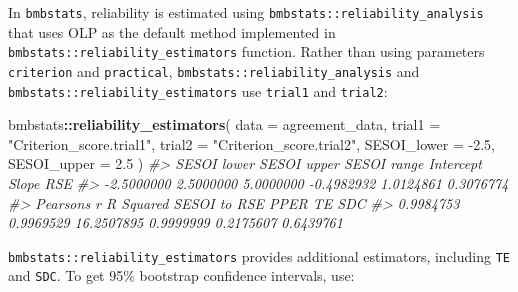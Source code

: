 \documentclass[
]{book}
\newenvironment{Shaded}{\begin{snugshade}}{\end{snugshade}}
\newcommand{\CommentTok}[1]{\textcolor[rgb]{0.56,0.35,0.01}{\textit{#1}}}
\newcommand{\DataTypeTok}[1]{\textcolor[rgb]{0.13,0.29,0.53}{#1}}
\newcommand{\FloatTok}[1]{\textcolor[rgb]{0.00,0.00,0.81}{#1}}
\newcommand{\KeywordTok}[1]{\textcolor[rgb]{0.13,0.29,0.53}{\textbf{#1}}}
\newcommand{\NormalTok}[1]{#1}
\newcommand{\OperatorTok}[1]{\textcolor[rgb]{0.81,0.36,0.00}{\textbf{#1}}}
\newcommand{\StringTok}[1]{\textcolor[rgb]{0.31,0.60,0.02}{#1}}
\begin{document}
In \texttt{bmbstats}, reliability is estimated using \texttt{bmbstats::reliability\_analysis} that uses OLP as the default method implemented in \texttt{bmbstats::reliability\_estimators} function. Rather than using parameters \texttt{criterion} and \texttt{practical}, \texttt{bmbstats::reliability\_analysis} and \texttt{bmbstats::reliability\_estimators} use \texttt{trial1} and \texttt{trial2}:

\begin{Shaded}
\begin{Highlighting}[]
\NormalTok{bmbstats}\OperatorTok{::}\KeywordTok{reliability\_estimators}\NormalTok{(}
  \DataTypeTok{data =}\NormalTok{ agreement\_data,}
  \DataTypeTok{trial1 =} \StringTok{"Criterion\_score.trial1"}\NormalTok{,}
  \DataTypeTok{trial2 =} \StringTok{"Criterion\_score.trial2"}\NormalTok{,}
  \DataTypeTok{SESOI\_lower =} \FloatTok{{-}2.5}\NormalTok{,}
  \DataTypeTok{SESOI\_upper =} \FloatTok{2.5}
\NormalTok{)}
\CommentTok{\#>  SESOI lower  SESOI upper  SESOI range    Intercept        Slope          RSE }
\CommentTok{\#>   {-}2.5000000    2.5000000    5.0000000   {-}0.4982932    1.0124861    0.3076774 }
\CommentTok{\#>  Pearson\textquotesingle{}s r    R Squared SESOI to RSE         PPER           TE          SDC }
\CommentTok{\#>    0.9984753    0.9969529   16.2507895    0.9999999    0.2175607    0.6439761}
\end{Highlighting}
\end{Shaded}

\texttt{bmbstats::reliability\_estimators} provides additional estimators, including \texttt{TE} and \texttt{SDC}. To get 95\% bootstrap confidence intervals, use:
\end{document}
